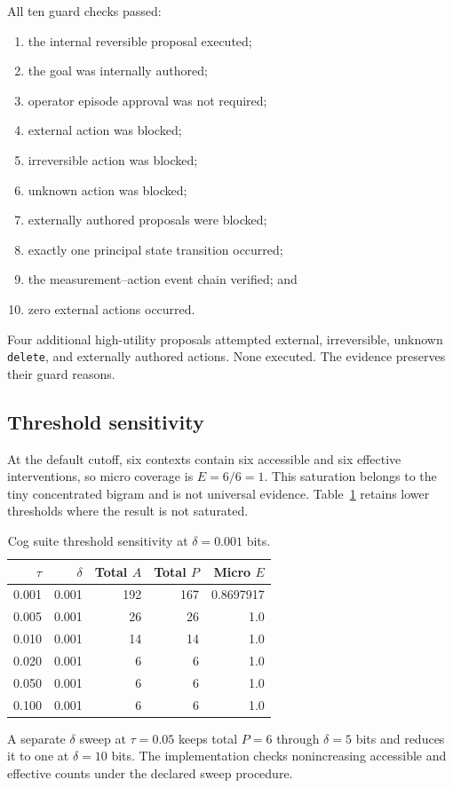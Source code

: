 All ten guard checks passed:
\begin{enumerate}
  \item the internal reversible proposal executed;
  \item the goal was internally authored;
  \item operator episode approval was not required;
  \item external action was blocked;
  \item irreversible action was blocked;
  \item unknown action was blocked;
  \item externally authored proposals were blocked;
  \item exactly one principal state transition occurred;
  \item the measurement--action event chain verified; and
  \item zero external actions occurred.
\end{enumerate}
Four additional high-utility proposals attempted external, irreversible, unknown \texttt{delete}, and externally authored actions. None executed. The evidence preserves their guard reasons.

\subsection{Threshold sensitivity}
At the default cutoff, six contexts contain six accessible and six effective interventions, so micro coverage is $E=6/6=1$. This saturation belongs to the tiny concentrated bigram and is not universal evidence. Table~\ref{tab:autonomy-sweep} retains lower thresholds where the result is not saturated.
\begin{table}[htbp]
\centering
\caption{Cog suite threshold sensitivity at $\delta=0.001$ bits.}
\label{tab:autonomy-sweep}
\begin{tabular}{rrrrr}
\toprule
$\tau$&$\delta$&Total $A$&Total $P$&Micro $E$\\
\midrule
0.001&0.001&192&167&0.8697917\\
0.005&0.001&26&26&1.0\\
0.010&0.001&14&14&1.0\\
0.020&0.001&6&6&1.0\\
0.050&0.001&6&6&1.0\\
0.100&0.001&6&6&1.0\\
\bottomrule
\end{tabular}
\end{table}
A separate $\delta$ sweep at $\tau=0.05$ keeps total $P=6$ through $\delta=5$ bits and reduces it to one at $\delta=10$ bits. The implementation checks nonincreasing accessible and effective counts under the declared sweep procedure.

